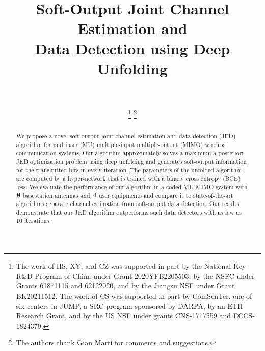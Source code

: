 \documentclass[conference,10pt,twocolumn]{IEEEtran}
\begin{document}
	
\title{Soft-Output Joint Channel Estimation and \\ Data Detection using Deep Unfolding}


\author{
	 \\
	
	
		\\[-0.99cm]
		
		\thanks{
		The work of HS, XY, and CZ was supported in part by the National Key R\&D Program of China under Grant 2020YFB2205503, by the NSFC under Grants 61871115 and 62122020, and by the Jiangsu NSF under Grant BK20211512. The work of CS was supported in part by ComSenTer, one of six centers in JUMP, a SRC program sponsored by DARPA, by an ETH Research Grant, and by the US NSF under grants CNS-1717559 and ECCS-1824379.}
\thanks{The authors thank Gian Marti for comments and suggestions. 
		}
}



\maketitle
\begin{abstract}
% 
We propose a novel soft-output joint channel estimation and data detection (JED) algorithm for multiuser (MU) multiple-input multiple-output (MIMO) wireless communication systems.
%
Our algorithm approximately solves a maximum a-posteriori JED optimization problem using deep unfolding and generates soft-output information for the transmitted bits in every iteration. 
%
The parameters of the unfolded algorithm are computed by a hyper-network that is trained with a binary cross entropy (BCE) loss. 
%
We evaluate the performance of our algorithm in a coded MU-MIMO system with $\bf 8$ basestation antennas and $\bf 4$ user equipments and compare it to state-of-the-art algorithms separate channel estimation from soft-output data detection. 
%
Our results demonstrate that our JED algorithm outperforms such data detectors with as few as 10 iterations. 
%
\end{abstract}
\end{document}
